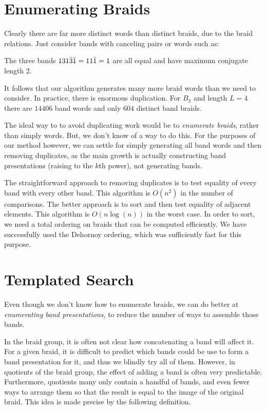 \documentclass[12pt]{thesis}
\begin{document}
\section{Enumerating Braids}

Clearly there are far more distinct words than distinct braids,
due to the braid relations.
Just consider bands with canceling pairs or words such as:
\begin{example}
     The three bands $1 3 1 \bar{3} \bar{1} = 1 1 \bar{1} = 1$ are
     all equal and have maximum conjugate length 2.
\end{example}
It follows that our algorithm generates many more braid words than we need to consider.
In practice, there is enormous duplication.
For $B_{3}$ and length $L = 4$ there are $14406$ band words
and only $604$ distinct band braids.

The ideal way to to avoid duplicating work would be to \textit{enumerate braids},
rather than simply words.
But, we don't know of a way to do this.
For the purposes of our method however, we can settle for simply
generating all band words and then removing duplicates, as the main growth is 
actually constructing band presentations (raising to the $k$th power), not generating bands.

The straightforward approach to removing duplicates is to test equality
of every band with every other band. 
This algorithm is $O(n^{2})$  in the number of comparisons.
The better approach is to sort and then test equality of adjacent elements.
This algorithm is $O(n \log(n))$ in the worst case.
In order to sort, we need a total ordering on braids that can be computed efficiently.
We have successfully used the Dehornoy ordering, which was sufficiently fast for this purpose.

\section{Templated Search}

Even though we don't know how to enumerate braids,
we can do better at \textit{enumerating band presentations},
to reduce the number of ways to assemble those bands.

In the braid group, it is often not clear how concatenating a band will affect it.
For a given braid, it is difficult to predict which bands could be use to form a band presentation for it,
and thus we blindly try all of them.
However, in quotients of the braid group, the effect of adding a band is often very predictable.
Furthermore, quotients many only contain a handful of bands,
and even fewer ways to arrange them so that the result is equal to the image of the original braid.
This idea is made precise by the following definition.
\end{document}
